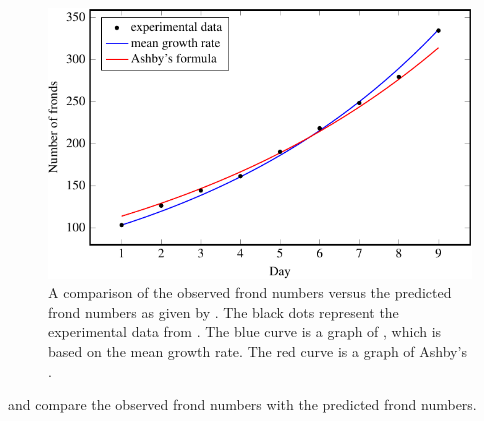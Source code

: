 \documentclass[a4paper,oneside,12pt]{article}
\begin{document}
\begin{problem}
{\begin{solution}
\begin{figure}[!htbp]
\centering
\includegraphics[scale=1.1]{image/11/frond12-estimated-b.pdf}
\caption{%
  A comparison of the observed frond numbers versus the predicted
  frond numbers as given by
  .
  The black dots
  represent the experimental data from
  .  The blue curve is a graph of
  , which is based
  on the mean growth rate.  The red curve is a graph of Ashby's
  .
}
\label{fig:frond12_theory_data}
\end{figure}

 and
 compare the observed frond numbers
with the predicted frond numbers.

\begin{table}[!htbp]
\centering

\caption{%
  Comparison of the observed frond numbers versus the predicted frond
  numbers.  The predicted frond numbers as calculated by
  are listed, respectively, in the third and fourth columns.  These
  numbers have been rounded to one decimal place.
}
\label{tab:frond12_compare_mean_Ashby}
\end{table}


\end{solution}}
\end{problem}
\end{document}
